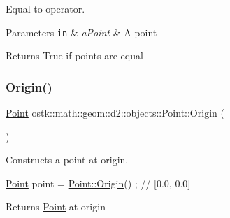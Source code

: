 Equal to operator. 


\begin{DoxyParams}[1]{Parameters}
\mbox{\tt in}  & {\em a\+Point} & A point \\
\hline
\end{DoxyParams}
\begin{DoxyReturn}{Returns}
True if points are equal 
\end{DoxyReturn}
\mbox{\label{classostk_1_1math_1_1geom_1_1d2_1_1objects_1_1_point_a7b9fe974c947b8b1e1e2349c2a15a669}} 
\subsubsection{\texorpdfstring{Origin()}{Origin()}}
{\footnotesize\ttfamily \hyperlink{classostk_1_1math_1_1geom_1_1d2_1_1objects_1_1_point}{Point} ostk\+::math\+::geom\+::d2\+::objects\+::\+Point\+::\+Origin (\begin{DoxyParamCaption}{ }\end{DoxyParamCaption})\hspace{0.3cm}{\ttfamily [static]}}



Constructs a point at origin. 


\begin{DoxyCode}
\hyperlink{classostk_1_1math_1_1geom_1_1d2_1_1objects_1_1_point_ad4252af4171fbe3cff37ada7827e1966}{Point} point = \hyperlink{classostk_1_1math_1_1geom_1_1d2_1_1objects_1_1_point_a7b9fe974c947b8b1e1e2349c2a15a669}{Point::Origin}() ; \textcolor{comment}{// [0.0, 0.0]}
\end{DoxyCode}


\begin{DoxyReturn}{Returns}
\hyperlink{classostk_1_1math_1_1geom_1_1d2_1_1objects_1_1_point}{Point} at origin 
\end{DoxyReturn}
\mbox{\label{classostk_1_1math_1_1geom_1_1d2_1_1objects_1_1_point_abcc3a265107dcccfcfe9349a6be788e5}} 
